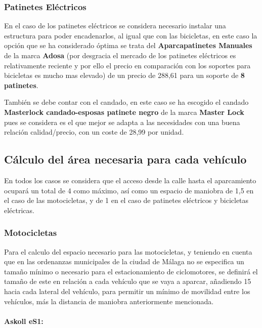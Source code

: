 \subsubsection{Patinetes Eléctricos}
En el caso de los patinetes eléctricos se considera necesario instalar una estructura para poder encadenarlos, al igual que con las bicicletas, en este caso la opción que se ha considerado óptima se trata del \textbf{Aparcapatinetes Manuales} de la marca \textbf{Adosa} \cite{aparcapatinetes} (por desgracia el mercado de los patinetes eléctricos es relativamente reciente y por ello el precio en comparación con los soportes para bicicletas es mucho mas elevado) de un precio de 288,61  para un soporte de  \textbf{8 patinetes}.

También se debe contar con el candado, en este caso se ha escogido el candado \textbf{Masterlock candado-esposas patinete negro} de la marca \textbf{Master Lock} pues se considera es el que mejor se adapta a las necesidades con una buena relación calidad/precio, con un coste de 28,99  por unidad.


\subsection{Cálculo del área necesaria para cada vehículo}

En todos los casos se considera que el acceso desde la calle hasta el aparcamiento ocupará un total de 4  como máximo, así como un espacio de maniobra de 1,5  en el caso de las motocicletas, y de 1  en el caso de patinetes eléctricos y bicicletas eléctricas.

\subsubsection{Motocicletas}
Para el calculo del espacio necesario para las motocicletas, y teniendo en cuenta que en las ordenanzas municipales de la ciudad de Málaga \cite{ordmalaga} no se especifica un tamaño mínimo o necesario para el estacionamiento de ciclomotores, se definirá el tamaño de este en relación a cada vehículo que se vaya a aparcar, añadiendo 15  hacia cada lateral del vehículo, para permitir un mínimo de movilidad entre los vehículos, más la distancia de maniobra anteriormente mencionada.

\paragraph{Askoll eS1:}
\label{askolles1}

